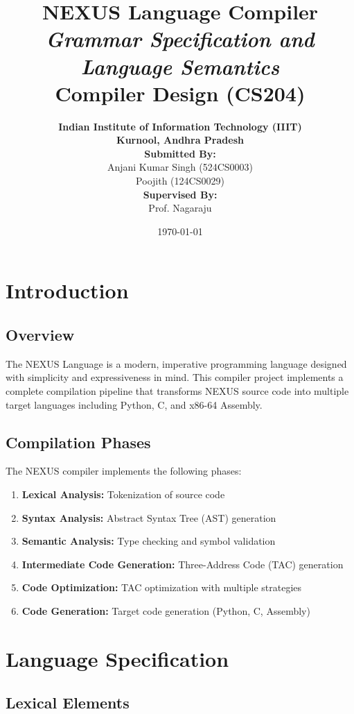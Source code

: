 \documentclass[12pt,a4paper]{report}
\title{\textbf{NEXUS Language Compiler}\\
\vspace{0.5cm}
\textit{Grammar Specification and Language Semantics}\\
\vspace{1cm}
\large Compiler Design (CS204)}
\author{
\textbf{Indian Institute of Information Technology (IIIT)}\\
\textbf{Kurnool, Andhra Pradesh}\\
\vspace{1cm}
\textbf{Submitted By:}\\
Anjani Kumar Singh \quad (524CS0003)\\
Poojith \quad (124CS0029)\\
\vspace{1cm}
\textbf{Supervised By:}\\
Prof. Nagaraju
}
\date{\today}
\begin{document}
\maketitle

\tableofcontents
\newpage

\chapter{Introduction}

\section{Overview}
The NEXUS Language is a modern, imperative programming language designed with simplicity and expressiveness in mind. This compiler project implements a complete compilation pipeline that transforms NEXUS source code into multiple target languages including Python, C, and x86-64 Assembly.

\section{Compilation Phases}
The NEXUS compiler implements the following phases:

\begin{enumerate}
    \item \textbf{Lexical Analysis:} Tokenization of source code
    \item \textbf{Syntax Analysis:} Abstract Syntax Tree (AST) generation
    \item \textbf{Semantic Analysis:} Type checking and symbol validation
    \item \textbf{Intermediate Code Generation:} Three-Address Code (TAC) generation
    \item \textbf{Code Optimization:} TAC optimization with multiple strategies
    \item \textbf{Code Generation:} Target code generation (Python, C, Assembly)
\end{enumerate}

\chapter{Language Specification}

\section{Lexical Elements}
\end{document}
